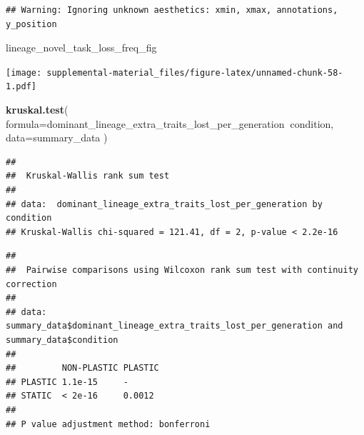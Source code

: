 \documentclass[]{book}
\newenvironment{Shaded}{\begin{snugshade}}{\end{snugshade}}
\newcommand{\DataTypeTok}[1]{\textcolor[rgb]{0.13,0.29,0.53}{#1}}
\newcommand{\FloatTok}[1]{\textcolor[rgb]{0.00,0.00,0.81}{#1}}
\newcommand{\KeywordTok}[1]{\textcolor[rgb]{0.13,0.29,0.53}{\textbf{#1}}}
\newcommand{\NormalTok}[1]{#1}
\newcommand{\OperatorTok}[1]{\textcolor[rgb]{0.81,0.36,0.00}{\textbf{#1}}}
\newcommand{\OtherTok}[1]{\textcolor[rgb]{0.56,0.35,0.01}{#1}}
\newcommand{\StringTok}[1]{\textcolor[rgb]{0.31,0.60,0.02}{#1}}
\begin{document}
\begin{verbatim}
## Warning: Ignoring unknown aesthetics: xmin, xmax, annotations, y_position
\end{verbatim}

\begin{Shaded}
\begin{Highlighting}[]
\NormalTok{lineage_novel_task_loss_freq_fig}
\end{Highlighting}
\end{Shaded}

\texttt{[image: supplemental-material\_files/figure-latex/unnamed-chunk-58-1.pdf]}

\begin{Shaded}
\begin{Highlighting}[]
\KeywordTok{kruskal.test}\NormalTok{(}
  \DataTypeTok{formula=}\NormalTok{dominant_lineage_extra_traits_lost_per_generation}\OperatorTok{~}\NormalTok{condition,}
  \DataTypeTok{data=}\NormalTok{summary_data}
\NormalTok{)}
\end{Highlighting}
\end{Shaded}

\begin{verbatim}
## 
##  Kruskal-Wallis rank sum test
## 
## data:  dominant_lineage_extra_traits_lost_per_generation by condition
## Kruskal-Wallis chi-squared = 121.41, df = 2, p-value < 2.2e-16
\end{verbatim}

\begin{Shaded}
\end{Shaded}

\begin{verbatim}
## 
##  Pairwise comparisons using Wilcoxon rank sum test with continuity correction 
## 
## data:  summary_data$dominant_lineage_extra_traits_lost_per_generation and summary_data$condition 
## 
##         NON-PLASTIC PLASTIC
## PLASTIC 1.1e-15     -      
## STATIC  < 2e-16     0.0012 
## 
## P value adjustment method: bonferroni
\end{verbatim}
\end{document}
